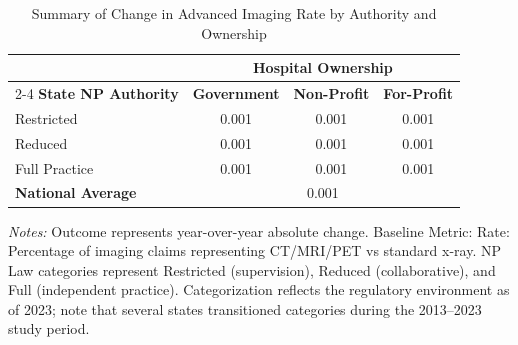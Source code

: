 \begin{table}[htbp]
    \centering
    \caption{Summary of Change in Advanced Imaging Rate by Authority and Ownership}
    \label{tab:d_partb_imaging_adv_rate}
    \vspace{0.2cm}
    \begin{tabular}{lccc}
        \toprule
        & \multicolumn{3}{c}{\textbf{Hospital Ownership}} \\
        \cmidrule(lr){2-4}
        \textbf{State NP Authority} & \textbf{Government} & \textbf{Non-Profit} & \textbf{For-Profit} \\
        \midrule
        Restricted & 0.001 & 0.001 & 0.001 \\
        Reduced & 0.001 & 0.001 & 0.001 \\
        Full Practice & 0.001 & 0.001 & 0.001 \\
        \midrule
        \textbf{National Average} & \multicolumn{3}{c}{0.001} \\
        \bottomrule
    \end{tabular}
    \vspace{0.1cm}
    \begin{minipage}{0.85\textwidth}
        \footnotesize \textit{Notes:} Outcome represents year-over-year absolute change. Baseline Metric: Rate: Percentage of imaging claims representing CT/MRI/PET vs standard x-ray. NP Law categories represent Restricted (supervision), Reduced (collaborative), and Full (independent practice). Categorization reflects the regulatory environment as of 2023; note that several states transitioned categories during the 2013--2023 study period.
    \end{minipage}
\end{table}